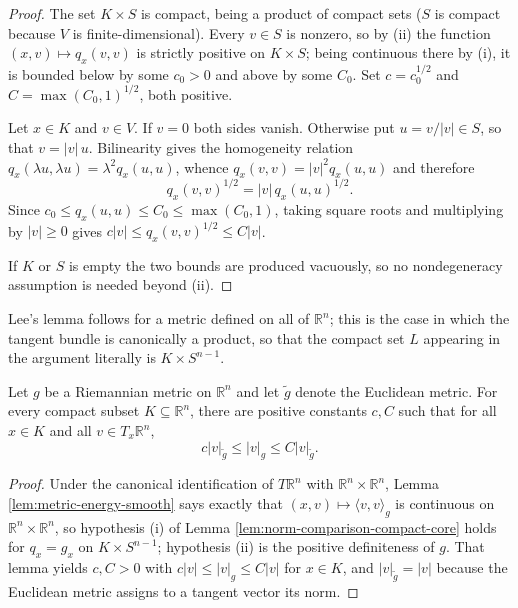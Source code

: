 \begin{proof}
\leanok
The set $K \times S$ is compact, being a product of compact sets ($S$ is compact because $V$ is
finite-dimensional). Every $v \in S$ is nonzero, so by (ii) the function $(x,v) \mapsto q_x(v,v)$
is strictly positive on $K \times S$; being continuous there by (i), it is bounded below by some
$c_0 > 0$ and above by some $C_0$. Set $c = c_0^{1/2}$ and $C = \max(C_0,1)^{1/2}$, both positive.

Let $x \in K$ and $v \in V$. If $v = 0$ both sides vanish. Otherwise put $u = v/|v| \in S$, so
that $v = |v|\,u$. Bilinearity gives the homogeneity relation $q_x(\lambda u, \lambda u) =
\lambda^2 q_x(u,u)$, whence $q_x(v,v) = |v|^2 q_x(u,u)$ and therefore
\[
q_x(v,v)^{1/2} = |v| \, q_x(u,u)^{1/2}.
\]
Since $c_0 \leq q_x(u,u) \leq C_0 \leq \max(C_0,1)$, taking square roots and multiplying by
$|v| \geq 0$ gives $c|v| \leq q_x(v,v)^{1/2} \leq C|v|$.

If $K$ or $S$ is empty the two bounds are produced vacuously, so no nondegeneracy assumption is
needed beyond (ii).
\end{proof}

Lee's lemma follows for a metric defined on all of $\mathbb{R}^n$; this is the case in which
the tangent bundle is canonically a product, so that the compact set $L$ appearing in the
argument literally is $K \times S^{n-1}$.

\begin{lemma}
\label{lem:riemannian-euclidean-norm-comparison-flat}
\leanok
{}
Let $g$ be a Riemannian metric on $\mathbb{R}^n$ and let $\tilde{g}$ denote the Euclidean
metric. For every compact subset $K \subseteq \mathbb{R}^n$, there are positive constants
$c, C$ such that for all $x \in K$ and all $v \in T_x \mathbb{R}^n$,
\[
c|v|_{\tilde{g}} \leq |v|_g \leq C|v|_{\tilde{g}}.
\]
\end{lemma}

\begin{proof}
\leanok
{}
Under the canonical identification of $T\mathbb{R}^n$ with $\mathbb{R}^n \times \mathbb{R}^n$,
Lemma \ref{lem:metric-energy-smooth} says exactly that $(x,v) \mapsto \langle v,v\rangle_g$ is
continuous on $\mathbb{R}^n \times \mathbb{R}^n$, so hypothesis (i) of Lemma
\ref{lem:norm-comparison-compact-core} holds for $q_x = g_x$ on $K \times S^{n-1}$; hypothesis
(ii) is the positive definiteness of $g$. That lemma yields $c, C > 0$ with
$c|v| \leq |v|_g \leq C|v|$ for $x \in K$, and $|v|_{\tilde{g}} = |v|$ because the Euclidean
metric assigns to a tangent vector its norm.
\end{proof}

